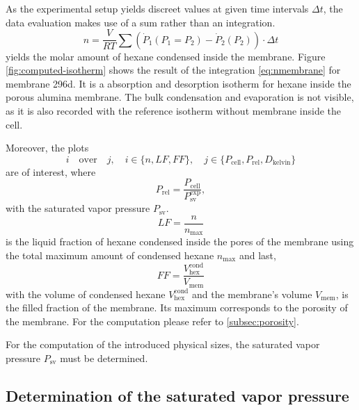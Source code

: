 \documentclass[../thesis.tex]{subfiles}
\begin{document}
        As the experimental setup yields discreet values at given time intervals $\Delta t$, the data evaluation makes use of a sum rather than an integration.
        \begin{equation}
            n = \frac{V}{RT} \sum \left( \dot{P}_1 ( P_1 = P_2) - \dot{P}_2(P_2) \right) \cdot \Delta t
            \label{eq:nmembrane}
        \end{equation}
        yields the molar amount of hexane condensed inside the membrane. Figure \cref{fig:computed-isotherm} shows the result of the integration \cref{eq:nmembrane} for membrane 296d. It is a absorption and desorption isotherm for hexane inside the porous alumina membrane. The bulk condensation and evaporation is not visible, as it is also recorded with the reference isotherm without membrane inside the cell.
        \medskip

        Moreover, the plots
        \begin{equation}
            i \quad \mathrm{over} \quad j,\quad i\in \{n,LF,FF\}, \quad j\in \{P_\mathrm{cell},P_\mathrm{rel},D_\mathrm{kelvin}\}
        \end{equation}
        are of interest, where
        \begin{equation}
            P_\mathrm{rel} = \frac{P_\mathrm{cell}}{P_\mathrm{sv}^\mathrm{exp}},
        \end{equation}
        with the saturated vapor pressure $P_\mathrm{sv}$.
        \begin{equation}
            LF = \frac{n}{n_\mathrm{max}}
        \end{equation}
        is the liquid fraction of hexane condensed inside the pores of the membrane using the total maximum amount of condensed hexane $n_\mathrm{max}$ and last,
        \begin{equation}
            FF = \frac{V_\mathrm{hex}^\mathrm{cond}}{V_\mathrm{mem}}
        \end{equation}
        with the volume of condensed hexane $V_\mathrm{hex}^\mathrm{cond}$ and the membrane's volume $V_\mathrm{mem}$, is the filled fraction of the membrane. Its maximum corresponds to the porosity of the membrane. For the computation please refer to \cref{subsec:porosity}.

        For the computation of the introduced physical sizes, the saturated vapor pressure $P_\mathrm{sv}$ must be determined.


        \subsection{Determination of the saturated vapor pressure}
\end{document}
